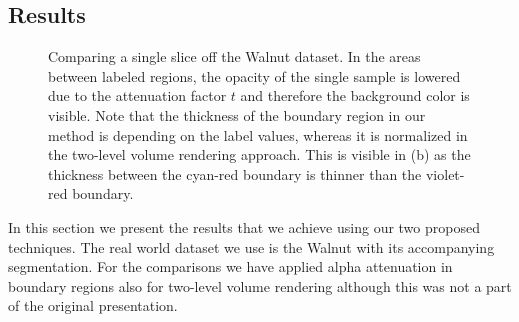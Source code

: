 \documentclass{egpubl}
\begin{document}
\subsection{Results}

\begin{figure}
	\centering
	\caption{Comparing a single slice off the Walnut dataset. In the areas between labeled regions, the opacity of the single sample is lowered due to the attenuation factor $t$ and therefore the background color is visible. Note that the thickness of the boundary region in our method is depending on the label values, whereas it is normalized in the two-level volume rendering approach. This is visible in (b) as the thickness between the cyan-red boundary is thinner than the violet-red boundary.}
	\label{fig:result:single}
\end{figure}

In this section we present the results that we achieve using our two proposed techniques. The real world dataset we use is the Walnut with its accompanying segmentation. For the comparisons we have applied alpha attenuation in boundary regions also for two-level volume rendering although this was not a part of the original presentation.
\end{document}
